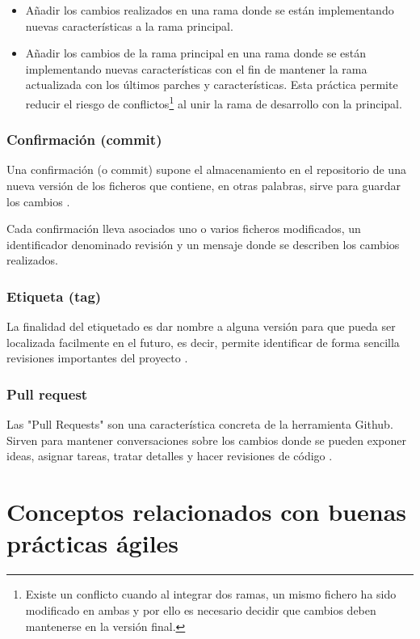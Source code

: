 \begin{itemize}
	\item Añadir los cambios realizados en una rama donde se están implementando nuevas características a la rama principal.
	\item Añadir los cambios de la rama principal en una rama donde se están implementando nuevas características con el fin de mantener la rama actualizada con los últimos parches y características. Esta práctica permite reducir el riesgo de conflictos\footnote{Existe un conflicto cuando al integrar dos ramas, un mismo fichero ha sido modificado en ambas y por ello es necesario decidir que cambios deben mantenerse en la versión final.} al unir la rama de desarrollo con la principal.
\end{itemize}

\subsubsection{Confirmación (commit)}

Una confirmación (o commit) supone el almacenamiento en el repositorio de una nueva versión de los ficheros que contiene, en otras palabras, sirve para guardar los cambios \cite{Chacon:2014:PG:2695634}.

Cada confirmación lleva asociados uno o varios ficheros modificados, un identificador denominado revisión y un mensaje donde se describen los cambios realizados.

\subsubsection{Etiqueta (tag)}

La finalidad del etiquetado es dar nombre a alguna versión para que pueda ser localizada facilmente en el futuro, es decir, permite identificar de forma sencilla revisiones importantes del proyecto \cite{wiki:002}.

\subsubsection{Pull request}

Las "Pull Requests" son una característica concreta de la herramienta Github. Sirven para mantener conversaciones sobre los cambios donde se pueden exponer ideas, asignar tareas, tratar detalles y hacer revisiones de código \cite{github:features}.

\section{Conceptos relacionados con buenas prácticas ágiles}

